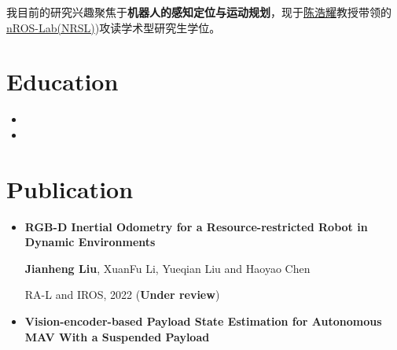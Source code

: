 \documentclass[11pt,a4paper,sans]{moderncv}        %
\begin{document}
\begin{CJK*}{UTF8}{gbsn}                          %
\makecvtitle

\small{我目前的研究兴趣聚焦于\textbf{机器人的感知定位与运动规划}，现于\href{faculty.hitsz.edu.cn/chenhaoyao}{陈浩耀}教授带领的\href{http://nrs-lab.com/}{nROS-Lab(NRSL)})攻读学术型研究生学位。

\section{Education}

\vspace{5pt}

\begin{itemize}

\item{}

\item{}

\end{itemize}

\vspace{2pt}

\section{Publication}

\vspace{5pt}

\begin{itemize}
    

\item{\textbf{RGB-D Inertial Odometry for a Resource-restricted Robot in Dynamic Environments}

\small{\textbf{Jianheng Liu}, XuanFu Li, Yueqian Liu and Haoyao Chen}

\small{RA-L and IROS, 2022 (\textbf{Under review}) }
}

\vspace{3pt}

\item{\textbf{Vision-encoder-based Payload State Estimation for Autonomous MAV With a Suspended Payload}

}
\end{itemize}}
\end{CJK*}
\end{document}
